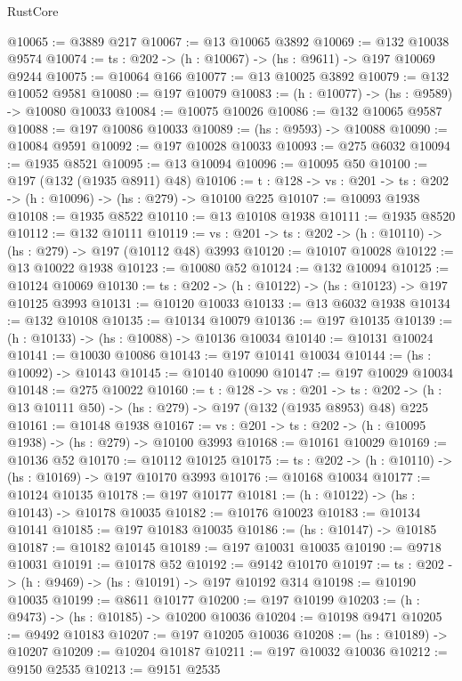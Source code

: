 \begin{lexlean}{RustCore}
\begin{coremodule}
@10065 := @3889 @217
@10067 := @13 @10065 @3892
@10069 := @132 @10038 @9574
@10074 := {ts : @202} -> (h : @10067) -> (hs : @9611) -> @197 @10069 @9244
@10075 := @10064 @166
@10077 := @13 @10025 @3892
@10079 := @132 @10052 @9581
@10080 := @197 @10079
@10083 := (h : @10077) -> (hs : @9589) -> @10080 @10033
@10084 := @10075 @10026
@10086 := @132 @10065 @9587
@10088 := @197 @10086 @10033
@10089 := (hs : @9593) -> @10088
@10090 := @10084 @9591
@10092 := @197 @10028 @10033
@10093 := @275 @6032
@10094 := @1935 @8521
@10095 := @13 @10094
@10096 := @10095 @50
@10100 := @197 (@132 (@1935 @8911) @48)
@10106 := {t : @128} -> {vs : @201} -> {ts : @202} -> (h : @10096) -> (hs : @279) -> @10100 @225
@10107 := @10093 @1938
@10108 := @1935 @8522
@10110 := @13 @10108 @1938
@10111 := @1935 @8520
@10112 := @132 @10111
@10119 := {vs : @201} -> {ts : @202} -> (h : @10110) -> (hs : @279) -> @197 (@10112 @48) @3993
@10120 := @10107 @10028
@10122 := @13 @10022 @1938
@10123 := @10080 @52
@10124 := @132 @10094
@10125 := @10124 @10069
@10130 := {ts : @202} -> (h : @10122) -> (hs : @10123) -> @197 @10125 @3993
@10131 := @10120 @10033
@10133 := @13 @6032 @1938
@10134 := @132 @10108
@10135 := @10134 @10079
@10136 := @197 @10135
@10139 := (h : @10133) -> (hs : @10088) -> @10136 @10034
@10140 := @10131 @10024
@10141 := @10030 @10086
@10143 := @197 @10141 @10034
@10144 := (hs : @10092) -> @10143
@10145 := @10140 @10090
@10147 := @197 @10029 @10034
@10148 := @275 @10022
@10160 := {t : @128} ->
  {vs : @201} ->
  {ts : @202} -> (h : @13 @10111 @50) -> (hs : @279) -> @197 (@132 (@1935 @8953) @48) @225
@10161 := @10148 @1938
@10167 := {vs : @201} -> {ts : @202} -> (h : @10095 @1938) -> (hs : @279) -> @10100 @3993
@10168 := @10161 @10029
@10169 := @10136 @52
@10170 := @10112 @10125
@10175 := {ts : @202} -> (h : @10110) -> (hs : @10169) -> @197 @10170 @3993
@10176 := @10168 @10034
@10177 := @10124 @10135
@10178 := @197 @10177
@10181 := (h : @10122) -> (hs : @10143) -> @10178 @10035
@10182 := @10176 @10023
@10183 := @10134 @10141
@10185 := @197 @10183 @10035
@10186 := (hs : @10147) -> @10185
@10187 := @10182 @10145
@10189 := @197 @10031 @10035
@10190 := @9718 @10031
@10191 := @10178 @52
@10192 := @9142 @10170
@10197 := {ts : @202} -> (h : @9469) -> (hs : @10191) -> @197 @10192 @314
@10198 := @10190 @10035
@10199 := @8611 @10177
@10200 := @197 @10199
@10203 := (h : @9473) -> (hs : @10185) -> @10200 @10036
@10204 := @10198 @9471
@10205 := @9492 @10183
@10207 := @197 @10205 @10036
@10208 := (hs : @10189) -> @10207
@10209 := @10204 @10187
@10211 := @197 @10032 @10036
@10212 := @9150 @2535
@10213 := @9151 @2535

\end{coremodule}
\end{lexlean}
